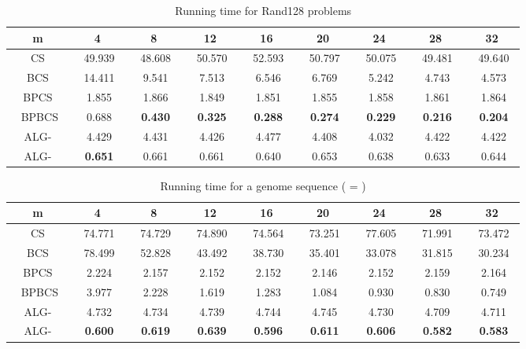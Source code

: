 \documentclass{llncs}
\newcommand{\rom}[1]{\uppercase\expandafter{\romannumeral #1\relax}}
\begin{document}
{\begin{table}
\begin{center}
\begin{tabular}{|c|c|c|c|c|c|c|c|c|}
\hline
m&4&8&12&16&20&24&28&32\\
\hline
CS &~ 49.939~ &~ 48.608~ &~ 50.570~ &~ 52.593~ &~ 50.797~ &~ 50.075~ &~ 49.481~ &~ 49.640~ \\
\hline
BCS &~ 14.411~ &~ 9.541~ &~ 7.513~ &~ 6.546~ &~ 6.769~ &~ 5.242~ &~ 4.743~ &~ 4.573~ \\
\hline
BPCS &~ 1.855~ &~ 1.866~ &~ 1.849~ &~ 1.851~ &~ 1.855~ &~ 1.858~ &~ 1.861~ &~ 1.864~ \\
\hline
~ BPBCS~ &~ 0.688~ &~ \textbf{0.430}~ &~ \textbf{0.325}~ &~ \textbf{0.288}~ &~ \textbf{0.274}~ &~ \textbf{0.229}~ &~ \textbf{0.216}~ &~ \textbf{0.204}~ \\
\hline
ALG-\rom{2} &~ 4.429~ &~ 4.431~ &~ 4.426~ &~ 4.477~ &~ 4.408~ &~ 4.032~ &~ 4.422~ &~ 4.422~ \\
\hline
ALG-\rom{1} &~ \textbf{0.651}~ &~ 0.661~ &~ 0.661~ &~ 0.640~ &~ 0.653~ &~ 0.638~ &~ 0.633~ &~ 0.644~ \\
\hline
\end{tabular}
\caption{Running time for Rand128 problems}
\label{Rand128}
\end{center}
\end{table}



\begin{table}
\begin{center}
\begin{tabular}{|c|c|c|c|c|c|c|c|c|}
\hline
m&4&8&12&16&20&24&28&32\\
\hline
CS &~ 74.771~ &~ 74.729~ &~ 74.890~ &~ 74.564~ &~ 73.251~ &~ 77.605~ &~ 71.991~ &~ 73.472~ \\
\hline
BCS &~ 78.499~ &~ 52.828~ &~ 43.492~ &~ 38.730~ &~ 35.401~ &~ 33.078~ &~ 31.815~ &~ 30.234~ \\
\hline
BPCS &~ 2.224~ &~ 2.157~ &~ 2.152~ &~ 2.152~ &~ 2.146~ &~ 2.152~ &~ 2.159~ &~ 2.164~ \\
\hline
~ BPBCS~ &~ 3.977~ &~ 2.228~ &~ 1.619~ &~ 1.283~ &~ 1.084~ &~ 0.930~ &~ 0.830~ &~ 0.749~ \\
\hline
ALG-\rom{2} &~ 4.732~ &~ 4.734~ &~ 4.739~ &~ 4.744~ &~ 4.745~ &~ 4.730~ &~ 4.709~ &~ 4.711~ \\
\hline
ALG-\rom{1} &~ \textbf{0.600}~ &~ \textbf{0.619}~ &~ \textbf{0.639}~ &~ \textbf{0.596}~ &~ \textbf{0.611}~ &~ \textbf{0.606}~ &~ \textbf{0.582}~ &~ \textbf{0.583}~ \\
\hline
\end{tabular}
\caption{Running time for a genome sequence ( = )} \label{genome}
\end{center}
\end{table}


}
\end{document}
